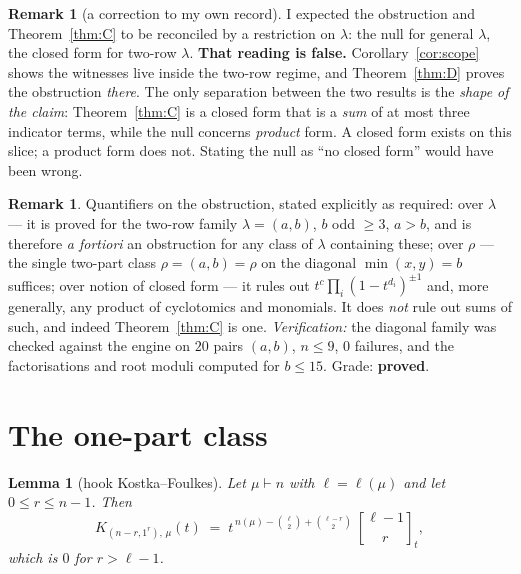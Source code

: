 \documentclass[11pt]{article}
\theoremstyle{plain}
\newtheorem{lemma}[theorem]{Lemma}
\theoremstyle{definition}
\newtheorem{remark}[theorem]{Remark}
\newcommand{\lam}{\lambda}
\newcommand{\qbin}[2]{\genfrac{[}{]}{0pt}{}{#1}{#2}_{t}}
\begin{document}
\begin{remark}[a correction to my own record]\label{rem:correction}
I expected the obstruction and Theorem~\ref{thm:C} to be reconciled by a restriction on
$\lam$: the null for general $\lam$, the closed form for two-row $\lam$. \textbf{That reading is
false.} Corollary~\ref{cor:scope} shows the witnesses live inside the two-row regime, and
Theorem~\ref{thm:D} proves the obstruction \emph{there}. The only separation between the two
results is the \emph{shape of the claim}: Theorem~\ref{thm:C} is a closed form that is a
\emph{sum} of at most three indicator terms, while the null concerns \emph{product} form. A
closed form exists on this slice; a product form does not. Stating the null as ``no closed form''
would have been wrong.
\end{remark}

\begin{remark}
Quantifiers on the obstruction, stated explicitly as required: over $\lam$ --- it is proved for
the two-row family $\lam=(a,b)$, $b$ odd $\ge 3$, $a>b$, and is therefore \emph{a fortiori} an
obstruction for any class of $\lam$ containing these; over $\rho$ --- the single two-part class
$\rho=(a,b)=\rho$ on the diagonal $\min(x,y)=b$ suffices; over notion of closed form --- it rules
out $t^c\prod_i(1-t^{d_i})^{\pm1}$ and, more generally, any product of cyclotomics and monomials.
It does \emph{not} rule out sums of such, and indeed Theorem~\ref{thm:C} is one.
\emph{Verification:} the diagonal family was checked against the engine on $20$ pairs $(a,b)$,
$n\le 9$, $0$ failures, and the factorisations and root moduli computed for $b\le 15$.
Grade: \textbf{proved}.
\end{remark}

\section{The one-part class}

\begin{lemma}[hook Kostka--Foulkes]\label{lem:hook}
Let $\mu\vdash n$ with $\ell=\ell(\mu)$ and let $0\le r\le n-1$. Then
\[
  K_{(n-r,1^r),\,\mu}(t)\;=\;t^{\,n(\mu)-\binom{\ell}{2}+\binom{\ell-r}{2}}\ \qbin{\ell-1}{r},
\]
which is $0$ for $r>\ell-1$.
\end{lemma}
\end{document}
